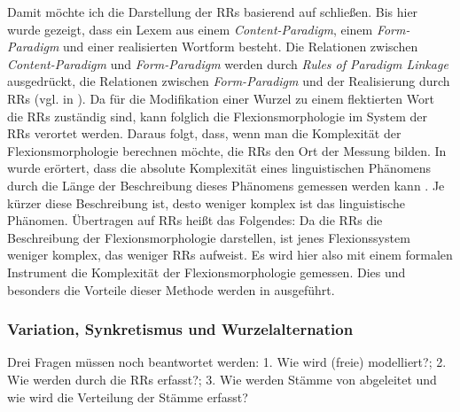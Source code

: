  Damit möchte ich die Darstellung der RRs basierend auf \citet[40–46 und 50–53]{Stump2001} schließen. Bis hier wurde gezeigt, dass ein Lexem aus einem \textit{Content-Paradigm}, einem \textit{Form-Paradigm} und einer realisierten Wortform besteht. Die Relationen zwischen \textit{Content-Paradigm} und \textit{Form-Paradigm} werden durch \textit{Rules of Paradigm Linkage} ausgedrückt, die Relationen zwischen \textit{Form-Paradigm} und der Realisierung durch RRs (vgl.  in ). Da für die Modifikation einer Wurzel zu einem flektierten Wort die RRs zuständig sind, kann folglich die Flexionsmorphologie im System der RRs verortet werden. Daraus folgt, dass, wenn man die Komplexität der Flexionsmorphologie berechnen möchte, die RRs den Ort der Messung bilden. In  wurde erörtert, dass die absolute Komplexität eines linguistischen Phänomens durch die Länge der Beschreibung dieses Phänomens gemessen werden kann \citep[24]{Miestamo2008}. Je kürzer diese Beschreibung ist, desto weniger komplex ist das linguistische Phänomen. Übertragen auf RRs heißt das Folgendes: Da die RRs die Beschreibung der Flexionsmorphologie darstellen, ist jenes Flexionssystem weniger komplex, das weniger RRs aufweist. Es wird hier also mit einem formalen Instrument die Komplexität der Flexionsmorphologie gemessen. Dies und besonders die Vorteile dieser Methode werden in  ausgeführt.

\subsubsection{Variation, Synkretismus und Wurzelalternation}\label{4.1.3.3}

Drei Fragen müssen noch beantwortet werden: 1. Wie wird (freie)  modelliert?; 2. Wie werden  durch die RRs erfasst?; 3. Wie werden Stämme von  abgeleitet und wie wird die Verteilung der Stämme erfasst?

